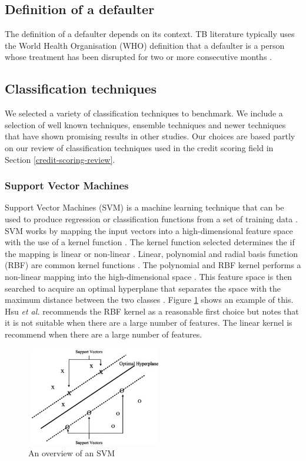 \documentclass{sig-alternate-05-2015}
\begin{document}
	\subsection{Definition of a defaulter}
	The definition of a defaulter depends on its context. TB literature typically uses the World Health Organisation (WHO) definition that a defaulter is a person whose treatment has been disrupted for two or more consecutive months \cite{chan:2003prevalence, cherkaoui:19326203, Jha:10.1371/journal.pone.0008873,jittimanee:10.1111/j.1440-172X.2007.00650.x,muture:6660173120110101, world2015TB}.
	
	\subsection{Classification techniques}
	We selected a variety of classification techniques to benchmark. We include a selection of well known techniques, ensemble techniques and newer techniques that have shown promising results in other studies. Our choices are based partly on our review of classification techniques used in the credit scoring field in Section \ref{credit-scoring-review}.
	\subsubsection{Support Vector Machines}
	Support Vector Machines (SVM) is a machine learning technique that can be used to produce regression or classification functions from a set of training data \cite{Luo20097562}. SVM works by mapping the input vectors into a high-dimensional feature space with the use of a kernel function \cite{Danenas20153194}. The kernel function selected determines the if the mapping is linear or non-linear \cite{Luo20097562}. Linear, polynomial and radial basis function (RBF) are common kernel functions \cite{hsu2003practical}. The polynomial and RBF kernel performs a non-linear mapping into the high-dimensional space \cite{hsu2003practical}. This feature space is then searched to acquire an optimal hyperplane that separates the space with the maximum distance between the two classes \cite{Danenas20153194}. Figure \ref{fig:svm-overview} shows an example of this. Hsu \textit{et al.} \cite{hsu2003practical} recommends the RBF kernel as a reasonable first choice but notes that it is not suitable when there are a large number of features. The linear kernel is recommend when there are a large number of features.
	
	\begin{figure}
		\centering
		\includegraphics[height=4.34cm, width=6cm]{SVM}
		\caption{An overview  of an SVM \cite{Li2006772}}
		\label{fig:svm-overview}
	\end{figure}
	
\end{document}
